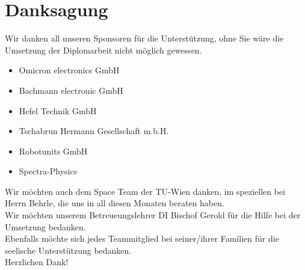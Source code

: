 \section{Danksagung}
Wir danken all unseren Sponsoren für die Unterstützung, ohne Sie wäre die Umsetzung der Diplomarbeit nicht möglich gewessen. \\
\begin{itemize}
	\item Omicron electronics GmbH\autocite{OMICRON_electronics_GmbH}
	\item Bachmann electronic GmbH\autocite{Bachmann_electronic_GmbH}
	\item Hefel Technik GmbH \autocite{Hefel_Technik_GmbH}
	\item Tschabrun Hermann Gesellschaft m.b.H.\autocite{Tschabrun_Hermann_Gesellschaft}
	\item Robotunits GmbH \autocite{robogmbh} 
	\item Spectra-Physics \autocite{Spectra}
\end{itemize}
Wir möchten auch dem Space Team\autocite{TU_Wien_Spaceteam} der TU-Wien danken, im speziellen bei Herrn Behrle, die uns in all diesen Monaten beraten haben.\\
\vspace{3mm}
Wir möchten unserem Betreueungslehrer DI Bischof Gerold für die Hilfe bei der Umsetzung bedanken.\\
\vspace{3mm}
Ebenfalls möchte sich jedes Teammitglied bei seiner/ihrer Familien für die seelische
Unterstützung bedanken. \\ 
\vspace{20mm}
Herzlichen Dank!